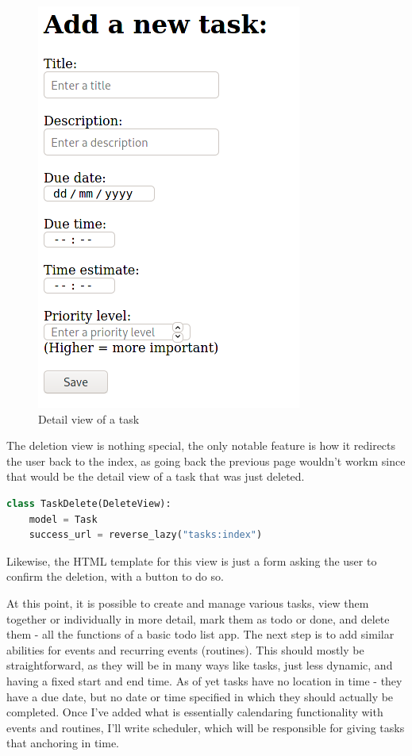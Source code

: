 \documentclass{article}
\begin{document}
\begin{figure}[H]
	\centering
	\includegraphics[width=0.5\linewidth]{Screenshots/task_form.png}
	\caption{Detail view of a task}
	\label{fig:task_form1}
\end{figure}

The deletion view is nothing special,
the only notable feature is how it redirects the user back to the index,
as going back the previous page wouldn't workm
since that would be the detail view of a task that was just deleted.

\begin{lstlisting}[language=Python, breaklines]
class TaskDelete(DeleteView):
    model = Task
    success_url = reverse_lazy("tasks:index")
\end{lstlisting}

Likewise,
the HTML template for this view is just a form asking the user to confirm the deletion,
with a button to do so.

At this point,
it is possible to create and manage various tasks,
view them together or individually in more detail,
mark them as todo or done,
and delete them -
all the functions of a basic todo list app.
The next step is to add similar abilities for events and recurring events (routines).
This should mostly be straightforward,
as they will be in many ways like tasks,
just less dynamic,
and having a fixed start and end time.
As of yet tasks have no location in time -
they have a due date,
but no date or time specified in which they should actually be completed.
Once I've added what is essentially calendaring functionality with events and routines,
I'll write scheduler,
which will be responsible for giving tasks that anchoring in time.
\end{document}
